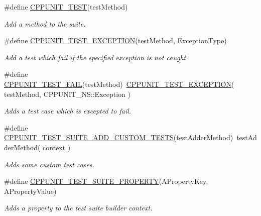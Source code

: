 \begin{DoxyCompactItemize}
\#define \hyperlink{group___writing_test_fixture_ga6ba5fe7b8f52e401268b984008838754}{C\+P\+P\+U\+N\+I\+T\+\_\+\+T\+E\+ST}(test\+Method)                                            
\begin{DoxyCompactList}\small\item\em Add a method to the suite. \end{DoxyCompactList}\item 
\#define \hyperlink{group___writing_test_fixture_ga0d51339f412270aee9a2d6c015d80ef2}{C\+P\+P\+U\+N\+I\+T\+\_\+\+T\+E\+S\+T\+\_\+\+E\+X\+C\+E\+P\+T\+I\+ON}(test\+Method,  Exception\+Type)                
\begin{DoxyCompactList}\small\item\em Add a test which fail if the specified exception is not caught. \end{DoxyCompactList}\item 
\#define \hyperlink{group___writing_test_fixture_ga5bdaf0444216a8f93ead13d5ae964d7e}{C\+P\+P\+U\+N\+I\+T\+\_\+\+T\+E\+S\+T\+\_\+\+F\+A\+IL}(test\+Method)~\hyperlink{group___writing_test_fixture_ga0d51339f412270aee9a2d6c015d80ef2}{C\+P\+P\+U\+N\+I\+T\+\_\+\+T\+E\+S\+T\+\_\+\+E\+X\+C\+E\+P\+T\+I\+ON}( test\+Method, C\+P\+P\+U\+N\+I\+T\+\_\+\+N\+S\+::\+Exception )
\begin{DoxyCompactList}\small\item\em Adds a test case which is excepted to fail. \end{DoxyCompactList}\item 
\#define \hyperlink{group___writing_test_fixture_ga516fec19cd7a7acb6fbf194bd98c4c09}{C\+P\+P\+U\+N\+I\+T\+\_\+\+T\+E\+S\+T\+\_\+\+S\+U\+I\+T\+E\+\_\+\+A\+D\+D\+\_\+\+C\+U\+S\+T\+O\+M\+\_\+\+T\+E\+S\+TS}(test\+Adder\+Method)~test\+Adder\+Method( context )
\begin{DoxyCompactList}\small\item\em Adds some custom test cases. \end{DoxyCompactList}\item 
\#define \hyperlink{group___writing_test_fixture_gac5ac4d8544ac2648a28bf7e4dcb27b9d}{C\+P\+P\+U\+N\+I\+T\+\_\+\+T\+E\+S\+T\+\_\+\+S\+U\+I\+T\+E\+\_\+\+P\+R\+O\+P\+E\+R\+TY}(A\+Property\+Key,  A\+Property\+Value)
\begin{DoxyCompactList}\small\item\em Adds a property to the test suite builder context. \end{DoxyCompactList}\end{DoxyCompactItemize}


